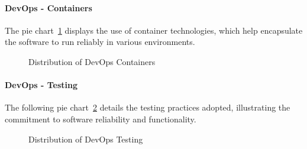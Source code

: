         \paragraph{DevOps - Containers}
        The pie chart~\ref{fig:devops-containers} displays the use of container technologies, which help encapsulate the software to run reliably in various environments.
        \begin{figure}[H]
\centering
{}
\caption{Distribution of DevOps Containers}
\label{fig:devops-containers}
\end{figure}

        \paragraph{DevOps - Testing}
        The following pie chart~\ref{fig:devops-testing} details the testing practices adopted, illustrating the commitment to software reliability and functionality.
        \begin{figure}[H]
\centering
{}
\caption{Distribution of DevOps Testing}
\label{fig:devops-testing}
\end{figure}















